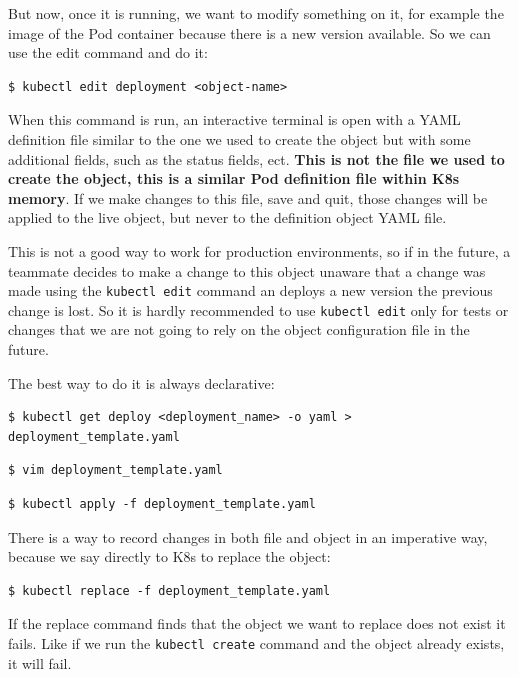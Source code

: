 \documentclass{article}
\newenvironment{blocktemplateII}[1]{%
    \tcolorbox[beamer,%
    noparskip,breakable,
    colframe=Green,%
    colbacklower=LimeGreen!75!LightGreen,%
    title=#1]}%
    {\endtcolorbox}
\newenvironment{codetemplate}[1][]{%
  \mybasecolorbox[#1]
  \itshape
}{%
  \endmybasecolorbox
}
\begin{document}
But now, once it is running, we want to modify something on it, for example the image of the Pod container because there is a new version available. So we can use the edit command and do it:

\begin{codetemplate}{}
\begin{verbatim}
$ kubectl edit deployment <object-name>
\end{verbatim}
\end{codetemplate}

When this command is run, an interactive terminal is open with a YAML definition file similar to the one we used to create the object but with some additional fields, such as the status fields, ect. \textbf{This is not the file we used to create the object, this is a similar Pod definition file within K8s memory}. If we make changes to this file, save and quit, those changes will be applied to the live object, but never to the definition object YAML file.

This is not a good way to work for production environments, so if in the future, a teammate decides to make a change to this object unaware that a change was made using the \verb|kubectl edit| command an deploys a new version the previous change is lost. So it is hardly recommended to use \verb|kubectl edit| only for tests or changes that we are not going to rely on the object configuration file in the future.

The best way to do it is always declarative:
\begin{codetemplate}{}
\begin{verbatim}
$ kubectl get deploy <deployment_name> -o yaml > deployment_template.yaml
\end{verbatim}
\end{codetemplate}
\begin{codetemplate}{}
\begin{verbatim}
$ vim deployment_template.yaml
\end{verbatim}
\end{codetemplate}
\begin{codetemplate}{}
\begin{verbatim}
$ kubectl apply -f deployment_template.yaml
\end{verbatim}
\end{codetemplate}

\begin{blocktemplateII}{NOTE}
There is a way to record changes in both file and object in an imperative way, because we say directly to K8s to replace the object:
\begin{codetemplate}{}
\begin{verbatim}
$ kubectl replace -f deployment_template.yaml
\end{verbatim}
\end{codetemplate}
If the replace command finds that the object we want to replace does not exist it fails. Like if we run the \verb|kubectl create| command and the object already exists, it will fail.
\end{blocktemplateII}
\end{document}
